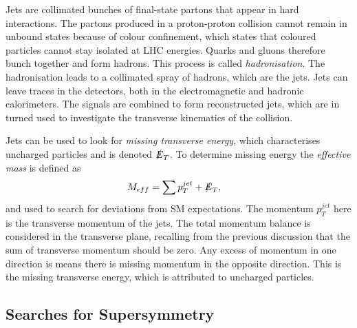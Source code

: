 \documentclass[twoside,english]{uiofysmaster}
\begin{document}
{Jets are collimated bunches of final-state partons that appear in hard interactions. The partons produced in a proton-proton collision cannot remain in unbound states because of colour confinement, which states that coloured particles cannot stay isolated at LHC energies. Quarks and gluons therefore bunch together and form hadrons. This process is called \textit{hadronisation}. The hadronisation leads to a collimated spray of hadrons, which are the jets. Jets can leave traces in the detectors, both in the electromagnetic and hadronic calorimeters. The signals are combined to form reconstructed jets, which are in turned used to investigate the transverse kinematics of the collision. 

Jets can be used to look for \textit{missing transverse energy}, which characterises uncharged particles and is denoted $\slashed{E}_T$. To determine missing energy the \textit{effective mass} is defined as
\begin{align}
M_{eff} &= \sum p_T^{jet} + \slashed{E}_T,
\end{align} 
and used to search for deviations from SM expectations. The momentum $p_T^{jet}$ here is the transverse momentum of the jets. The total momentum balance is considered in the transverse plane, recalling from the previous discussion that the sum of transverse momentum should be zero. Any excess of momentum in one direction is means there is missing momentum in the opposite direction. This is the missing transverse energy, which is attributed to uncharged particles.  



\subsection{Searches for Supersymmetry}

}
\end{document}

